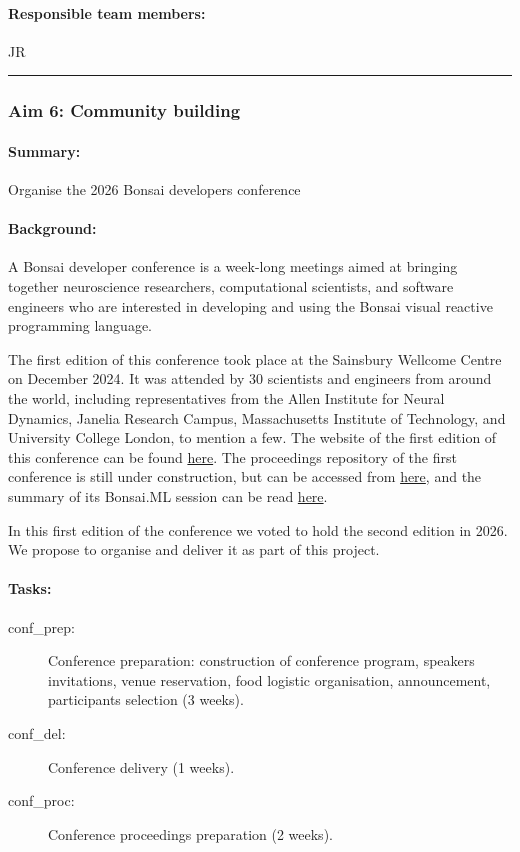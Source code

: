 \paragraph{Responsible team members:} JR

\noindent\rule{\textwidth}{1pt}
\subsubsection{Aim 6: Community building}
\paragraph{Summary:} Organise the 2026 Bonsai developers conference

\paragraph{Background:} A Bonsai developer conference is a week-long
meetings aimed at bringing together neuroscience researchers, computational
scientists, and software engineers who are interested in developing and using
the Bonsai visual reactive programming language.

The first edition of this conference took place at the Sainsbury Wellcome
Centre on December 2024. It was attended by 30 scientists and engineers from
around the world, including representatives from the Allen Institute for Neural
Dynamics, Janelia Research Campus, Massachusetts Institute of Technology, and
University College London, to mention a few.
%
The website of the first edition of this conference  can be found
\href{https://conference.bonsai-rx.org/2024/}{here}.  The proceedings
repository of the first conference is still under construction, but can be
accessed from
\href{https://github.com/joacorapela/bonsaiConference2024Proceedings}{here},
and the summary of its Bonsai.ML session can be read
\href{https://github.com/joacorapela/bonsaiConference2024Proceedings/blob/master/sessions/machineLearning/README.md}{here}.

In this first edition of the conference we voted to hold the second edition in
2026. We propose to organise and deliver it as part of this project.

\paragraph{Tasks:}

\begin{description}

    \item[conf\_prep:] Conference preparation: construction of conference
        program, speakers invitations, venue reservation, food logistic
        organisation, announcement, participants selection (3 weeks).
    \item[conf\_del:] Conference delivery (1 weeks).
    \item[conf\_proc:] Conference proceedings preparation (2 weeks).

\end{description}

